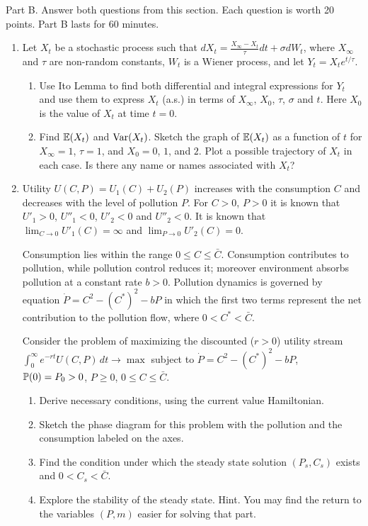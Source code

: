 \documentclass[12pt, a4paper]{article}
\begin{document}
Part B.
Answer both questions from this section. Each question is worth 20 points.
Part B lasts for 60 minutes.
\begin{enumerate}[resume]
\item Let $X_t$ be a stochastic process such that
$dX_t=\frac{X_{\infty}-X_t}{\tau}dt+\sigma dW_t$, where $X_{\infty}$ and $\tau$ are non-random constants, $W_t$ is a Wiener process, and let $Y_t=X_t e^{t/\tau}$.
\begin{enumerate}
\item Use Ito Lemma to find both differential and integral expressions for $Y_t$ and use them to express $X_t$ (a.s.) in terms of $X_{\infty}$, $X_0$, $\tau$, $\sigma$ and $t$. Here $X_0$ is the value of $X_t$ at time $t=0$.
\item Find $\E(X_t)$ and $\Var(X_t)$. Sketch the graph of $\E(X_t)$ as a function of $t$ for $X_{\infty}=1$, $\tau=1$, and $X_0 = 0$, $1$, and $2$. Plot a possible trajectory of $X_t$ in each case. Is there any name or names associated with $X_t$?
\end{enumerate}

\item Utility $U(C,P)=U_1(C)+U_2(P)$ increases with the consumption $C$ and decreases with the level of pollution $P$. For $C>0$, $P>0$ it is known that $U'_1>0$, $U''_1<0$, $U'_2<0$ and $U''_2<0$. It is known that $\lim_{C\to 0} U'_1(C)=\infty$ and $\lim_{P\to 0} U'_2(C)=0$.

Consumption lies within the range $0\leq C\leq \bar{C}$. Consumption contributes to pollution, while pollution control reduces it; moreover environment absorbs pollution at a constant rate $b>0$.  Pollution dynamics is governed by equation $\dot{P}=C^2-(C^*)^2-bP$ in which the first two terms represent the net contribution to the pollution flow, where $0<C^*<\bar{C}$.

Consider the problem of maximizing the discounted ($r>0$) utility stream
$\int_0^{\infty}e^{-rt}U(C,P)\, dt \to \max$
subject to $\dot{P}=C^2-(C^*)^2-bP$, $\P(0)=P_0>0$, $P\geq 0$, $0\leq C\leq \bar{C}$.
\begin{enumerate}
\item Derive necessary conditions, using the current value Hamiltonian.
\item Sketch the phase diagram for this problem with the pollution and the consumption labeled on the axes.
\item Find the condition under which the steady state solution $(P_s,C_s)$ exists and $0<C_s<\bar{C}$.
\item Explore the stability of the steady state. Hint. You may find the return to the variables $(P,m)$ easier for solving that part.
\end{enumerate}
\end{enumerate}
\end{document}
